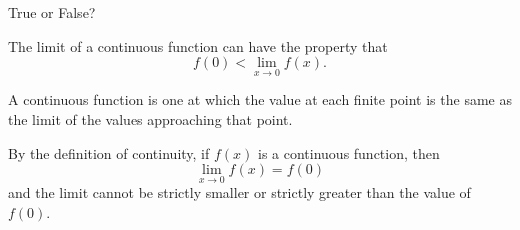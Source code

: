 \documentclass{ximera}
\author{Emma Smith Zbarsky}
\begin{document}
\begin{exercise}

True or False?

The limit of a continuous function can have the property that
\[f(0) < \lim_{x\to 0} f(x).\]


\begin{hint}
A continuous function is one at which the value at each finite point is
the same as the limit of the values approaching that point.
\end{hint}


\begin{hint}
By the definition of continuity, if $f(x)$ is a continuous function,
then \[\lim_{x \to 0} f(x) = f(0)\] and the limit cannot be strictly
smaller or strictly greater than the value of $f(0)$.
\end{hint}


\begin{multipleChoice}
\end{multipleChoice}

\end{exercise}
\end{document}
